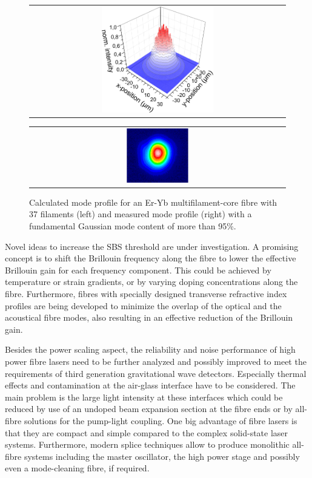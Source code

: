 \begin{figure}[h]
\begin{center}
  \begin{tabular}[c]{c}
    \includegraphics[width=0.45\textwidth]{./Sec_Optics/mfc_mode_calc.png}
  \end{tabular}
  \hspace*{1cm}
  \begin{tabular}[c]{c}
    \includegraphics[width=0.25\textwidth]{./Sec_Optics/mfc_mode}
  \end{tabular}
  \caption{Calculated mode profile for an Er-Yb multifilament-core fibre with 37 filaments (left) and measured mode profile (right) with a fundamental Gaussian mode content of more than 95\%.}
  \label{fig:mfc_mode}
\end{center}
\end{figure}

Novel ideas to increase the SBS threshold are under investigation. A promising concept is to shift the Brillouin frequency along the fibre to lower the effective Brillouin gain for each frequency component. This could be achieved by temperature or strain gradients, or by varying doping concentrations along the fibre.
Furthermore, fibres with specially designed transverse refractive index profiles are being developed to minimize the overlap of the optical and the acoustical fibre modes, also resulting in an effective reduction of the Brillouin gain.

Besides the power scaling aspect, the reliability and noise performance of high power fibre lasers need to be further analyzed and possibly improved to meet the requirements of third generation gravitational wave detectors. Especially thermal effects and contamination at the air-glass interface have to be considered. The main problem is the large light intensity at these interfaces which could be reduced by use of an undoped beam expansion section at the fibre ends or by all-fibre solutions for the pump-light coupling. One big advantage of fibre lasers is that they are compact and simple compared to the complex solid-state laser systems. Furthermore, modern splice techniques allow to produce monolithic all-fibre systems including the master oscillator, the high power stage and possibly even a mode-cleaning fibre, if required.

